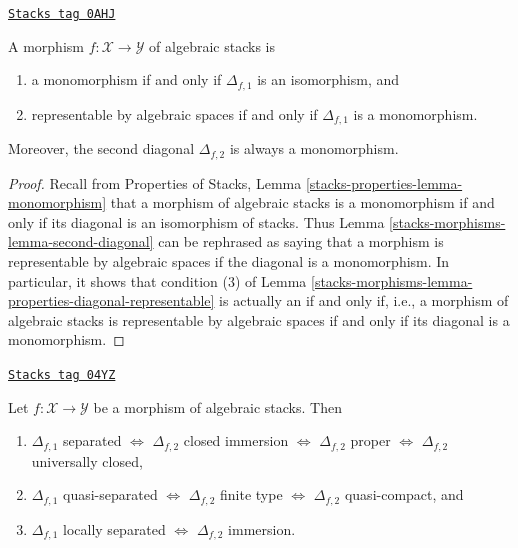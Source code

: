 \begin{lemma}[Hierarchy]
\label{stacks-morphisms-lemma-hierarchy}
\href{https://stacks.math.columbia.edu/tag/0AHJ}{\texttt{Stacks tag 0AHJ}}

A morphism $f : \mathcal{X} \to \mathcal{Y}$ of algebraic stacks is
\begin{enumerate}
\item a monomorphism if and only if $\Delta_{f, 1}$ is an isomorphism, and
\item representable by algebraic spaces if and only if $\Delta_{f, 1}$
is a monomorphism.
\end{enumerate}
Moreover, the second diagonal $\Delta_{f, 2}$ is always a monomorphism.
\end{lemma}

\begin{proof}
Recall from Properties of Stacks, Lemma
\ref{stacks-properties-lemma-monomorphism}
that a morphism of algebraic stacks is a monomorphism
if and only if its diagonal is an isomorphism of stacks.
Thus Lemma \ref{stacks-morphisms-lemma-second-diagonal}
can be rephrased as saying that a morphism is
representable by algebraic spaces if the diagonal
is a monomorphism. In particular, it shows that condition
(3) of Lemma \ref{stacks-morphisms-lemma-properties-diagonal-representable}
is actually an if and only if, i.e., a morphism of algebraic stacks
is representable by algebraic spaces if and only if
its diagonal is a monomorphism.
\end{proof}

\begin{lemma}
\label{stacks-morphisms-lemma-first-diagonal-separated-second-diagonal-closed}
\href{https://stacks.math.columbia.edu/tag/04YZ}{\texttt{Stacks tag 04YZ}}

Let $f : \mathcal{X} \to \mathcal{Y}$ be a morphism of algebraic stacks.
Then
\begin{enumerate}
\item $\Delta_{f, 1}$ separated $\Leftrightarrow$
$\Delta_{f, 2}$ closed immersion $\Leftrightarrow$
$\Delta_{f, 2}$ proper $\Leftrightarrow$
$\Delta_{f, 2}$ universally closed,
\item $\Delta_{f, 1}$ quasi-separated $\Leftrightarrow$
$\Delta_{f, 2}$ finite type $\Leftrightarrow$ $\Delta_{f, 2}$ quasi-compact,
and
\item $\Delta_{f, 1}$ locally separated $\Leftrightarrow$
$\Delta_{f, 2}$ immersion.
\end{enumerate}
\end{lemma}

